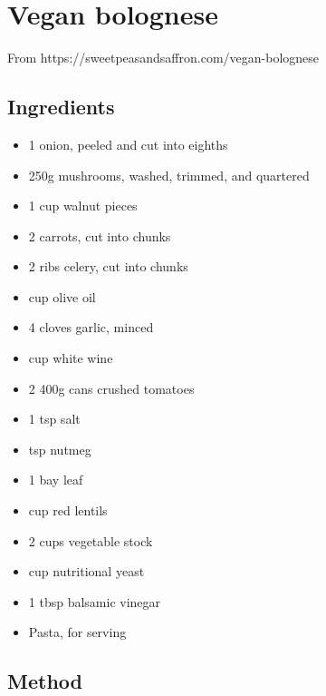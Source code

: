 \section{Vegan bolognese}



From https://sweetpeasandsaffron.com/vegan-bolognese

\subsection{Ingredients}

\begin{itemize}
	\item 1 onion, peeled and cut into eighths
    \item 250g mushrooms, washed, trimmed, and quartered
    \item 1 cup walnut pieces
    \item 2 carrots, cut into chunks
    \item 2 ribs celery, cut into chunks
    \item {} cup olive oil
    \item 4 cloves garlic, minced
    \item {} cup white wine
    \item 2 400g cans crushed tomatoes
    \item 1 tsp salt
    \item {} tsp nutmeg
    \item 1 bay leaf
    \item {} cup red lentils
    \item 2 cups vegetable stock
    \item {} cup nutritional yeast
    \item 1 tbsp balsamic vinegar
    \item Pasta, for serving
\end{itemize}

\subsection{Method}

